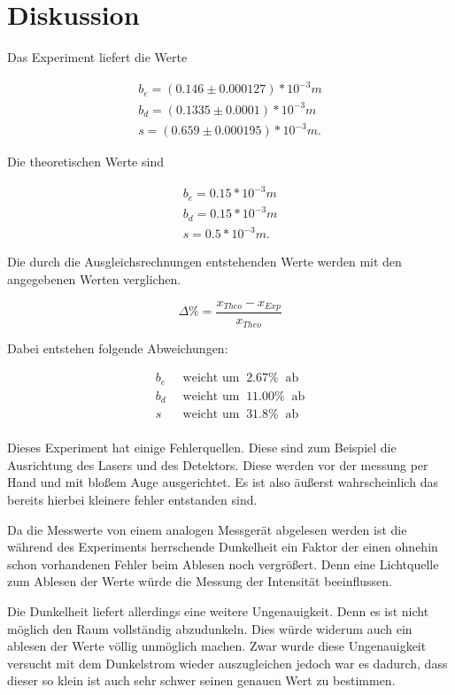 \section{Diskussion}

Das Experiment liefert die Werte

\begin{align*}
    b_e = (0.146\pm 0.000127)*10^{-3}m \\
    b_d = (0.1335\pm 0.0001)* 10^{-3}m  \\
    s = (0.659\pm 0.000195)* 10^{-3}m.
\end{align*}

Die theoretischen Werte sind

\begin{align*}
    b_e = 0.15*10^{-3}m \\
    b_d = 0.15* 10^{-3}m  \\
    s = 0.5* 10^{-3}m.
\end{align*}

Die durch die Ausgleichsrechnungen entstehenden Werte werden mit den angegebenen Werten verglichen. 

\begin{equation*}
    \Delta \% = \frac{x_{Theo}-x_{Exp}}{x_{Theo}}
\end{equation*}

Dabei entstehen folgende Abweichungen:

\begin{align*}
b_e \; \; & \text{weicht um} \; \; 2.67\% \; \; \text{ab} \\
b_d \; \; & \text{weicht um} \; \; 11.00\% \; \; \text{ab} \\ 
s \; \; & \text{weicht um} \; \; 31.8\% \; \; \text{ab}  \\
\end{align*}

Dieses Experiment hat einige Fehlerquellen. Diese sind zum Beispiel die Ausrichtung des Lasers und des Detektors. Diese werden vor der messung per Hand und mit bloßem Auge ausgerichtet. Es ist also äußerst wahrscheinlich das bereits hierbei kleinere fehler entstanden sind.

Da die Messwerte von einem analogen Messgerät abgelesen werden ist die während des Experiments herrschende Dunkelheit ein Faktor der einen ohnehin schon vorhandenen Fehler beim Ablesen noch vergrößert. Denn eine Lichtquelle zum Ablesen der Werte würde die Messung der Intensität beeinflussen.

Die Dunkelheit liefert allerdings eine weitere Ungenauigkeit. Denn es ist nicht möglich den Raum vollständig abzudunkeln. Dies würde widerum auch ein ablesen der Werte völlig unmöglich machen. Zwar wurde diese Ungenauigkeit versucht mit dem Dunkelstrom wieder auszugleichen jedoch war es dadurch, dass dieser so klein ist auch sehr schwer seinen genauen Wert zu bestimmen.

